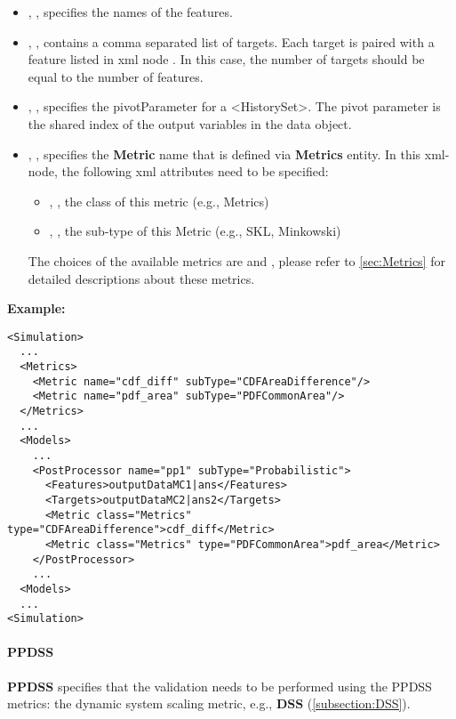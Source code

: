 %
%

\begin{itemize}
  \item {}, , specifies the names of the features.
  \item {}, , contains a comma separated list of
    targets. \nb Each target is paired with a feature listed in xml node . In this case, the
    number of targets should be equal to the number of features.
  \item {}, , specifies the pivotParameter for a <HistorySet>.
    The pivot parameter is the shared index of the output variables in the data object.
  \item {}, , specifies the \textbf{Metric} name that is defined via
    \textbf{Metrics} entity. In this xml-node, the following xml attributes need to be specified:
    \begin{itemize}
      \item {}, , the class of this metric (e.g., Metrics)
      \item {}, , the sub-type of this Metric (e.g., SKL, Minkowski)
    \end{itemize}
    \nb The choices of the available metrics are  and , please
    refer to \ref{sec:Metrics} for detailed descriptions about these metrics.
\end{itemize}

\textbf{Example:}
\begin{lstlisting}[style=XML,morekeywords={subType}]
<Simulation>
  ...
  <Metrics>
    <Metric name="cdf_diff" subType="CDFAreaDifference"/>
    <Metric name="pdf_area" subType="PDFCommonArea"/>
  </Metrics>
  ...
  <Models>
    ...
    <PostProcessor name="pp1" subType="Probabilistic">
      <Features>outputDataMC1|ans</Features>
      <Targets>outputDataMC2|ans2</Targets>
      <Metric class="Metrics" type="CDFAreaDifference">cdf_diff</Metric>
      <Metric class="Metrics" type="PDFCommonArea">pdf_area</Metric>
    </PostProcessor>
    ...
  <Models>
  ...
<Simulation>
\end{lstlisting}

\paragraph{PPDSS}
\textbf{PPDSS} specifies that the validation needs to be performed
using the PPDSS metrics: the dynamic system scaling metric, e.g., \textbf{DSS} (\ref{subsection:DSS}).

